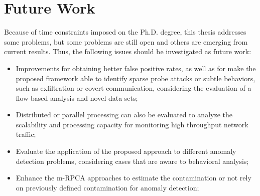 \section{Future Work}
\label{sc:conc_futurework}

Because of time constraints imposed on the Ph.D. degree, this thesis addresses some problems, but some problems are still open and others are emerging from current results. Thus, the following issues should be investigated as future work:

\begin{itemize}
	\item Improvements for obtaining better false positive rates, as well as for make the proposed framework able to identify sparse probe attacks or subtle behaviors, such as exfiltration or covert communication, considering the evaluation of a flow-based analysis and novel data sets;
	\item Distributed or parallel processing can also be evaluated to analyze the scalability and processing capacity for monitoring high throughput network traffic;
	\item Evaluate the application of the proposed approach to different anomaly detection problems, considering cases that are aware to behavioral analysis;
	\item Enhance the m-RPCA approaches to estimate the contamination or not rely on previously defined contamination for anomaly detection;
\end{itemize}